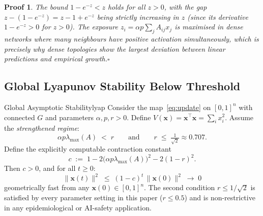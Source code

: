 \documentclass[10pt,twocolumn]{article}
\theoremstyle{myproof}
\newtheorem*{proof*}{Proof}
\newcommand{\lmax}{\lambda_{\max}}
\begin{document}
\begin{proof*}
The bound $1-e^{-z}<z$ holds for all $z>0$, with the gap $z-(1-e^{-z})=z-1+e^{-z}$ being
strictly increasing in $z$ (since its derivative $1-e^{-z}>0$ for $z>0$). The exposure
$z_i=\alpha p\sum_j A_{ij}x_j$ is maximised in dense networks where many neighbours have
positive activation simultaneously, which is precisely why dense topologies show the largest
deviation between linear predictions and empirical growth.\hfill$\square$
\end{proof*}

\subsection{Global Lyapunov Stability Below Threshold}

\begin{theorem}{Global Asymptotic Stability}{lyap}
Consider the map~\eqref{eq:update} on $[0,1]^n$ with connected $G$ and parameters $\alpha,p,r>0$.
Define $V(\mathbf{x})=\mathbf{x}^\top\mathbf{x}=\sum_i x_i^2$.
Assume the \emph{strengthened regime}:
\begin{equation}
\label{eq:lyap_regime}
  \alpha p\lmax(A)\;<\;r \qquad\text{and}\qquad r\;\leq\;\tfrac{1}{\sqrt{2}}\approx 0.707.
\end{equation}
Define the explicitly computable contraction constant
\begin{equation}
\label{eq:c_formula}
  c\;:=\;1-2\bigl(\alpha p\lmax(A)\bigr)^2-2(1-r)^2.
\end{equation}
Then $c>0$, and for all $t\geq 0$:
\[
  \bigl\|\mathbf{x}(t)\bigr\|^2\;\leq\;(1-c)^{t}\,\bigl\|\mathbf{x}(0)\bigr\|^2\;\longrightarrow\;0
\]
geometrically fast from any $\mathbf{x}(0)\in[0,1]^n$.
The second condition $r\leq 1/\sqrt{2}$ is satisfied by every parameter setting in this paper
($r\leq 0.5$) and is non-restrictive in any epidemiological or AI-safety application.
\end{theorem}
\end{document}
